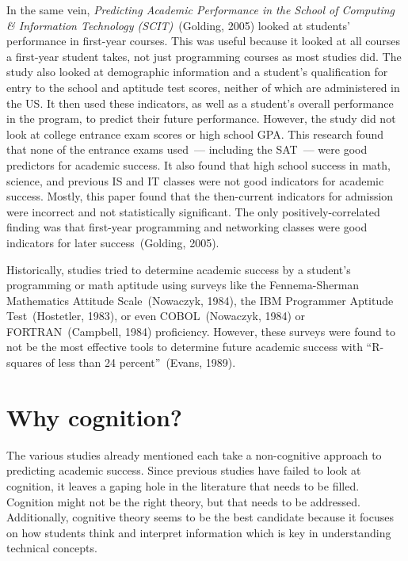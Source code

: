 In the same vein, \textit{Predicting Academic Performance in the School of Computing \& Information Technology (SCIT)}~(Golding, 2005) looked at students' performance in first-year courses. This was useful because it looked at all courses a first-year student takes, not just programming courses as most studies did. The study also looked at demographic information and a student's qualification for entry to the school and aptitude test scores, neither of which are administered in the US. It then used these indicators, as well as a student's overall performance in the program, to predict their future performance. However, the study did not look at college entrance exam scores or high school GPA. This research found that none of the entrance exams used~--- including the SAT~--- were good predictors for academic success. It also found that high school success in math, science, and previous IS and IT classes were not good indicators for academic success. Mostly, this paper found that the then-current indicators for admission were incorrect and not statistically significant. The only positively-correlated finding was that first-year programming and networking classes were good indicators for later success~(Golding, 2005).

Historically, studies tried to determine academic success by a student's programming or math aptitude using surveys like the Fennema-Sherman Mathematics Attitude Scale~(Nowaczyk, 1984), the IBM Programmer Aptitude Test~(Hostetler, 1983), or even COBOL~(Nowaczyk, 1984) or FORTRAN~(Campbell, 1984) proficiency. However, these surveys were found to not be the most effective tools to determine future academic success with ``R-squares of less than 24 percent''~(Evans, 1989).

\section{Why cognition?}
The various studies already mentioned each take a non-cognitive approach to predicting academic success. Since previous studies have failed to look at cognition, it leaves a gaping hole in the literature that needs to be filled. Cognition might not be the right theory, but that needs to be addressed. Additionally, cognitive theory seems to be the best candidate because it focuses on how students think and interpret information which is key in understanding technical concepts.

